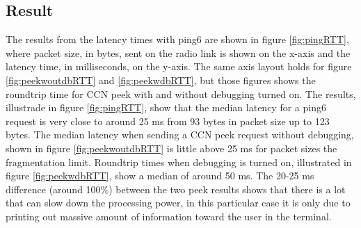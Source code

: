 \subsection{Result}

The results from the latency times with ping6 are shown in figure \ref{fig:pingRTT}, where packet size, in bytes, sent on the radio link is shown on the x-axis and the latency time, in milliseconds, on the y-axis. The same axis layout holds for figure \ref{fig:peekwoutdbRTT} and \ref{fig:peekwdbRTT}, but those figures shows the roundtrip time for CCN peek with and without debugging turned on. The results, illustrade in figure \ref{fig:pingRTT}, show that the median latency for a ping6 request is very close to around 25 ms from 93 bytes in packet size up to 123 bytes. The median latency when sending a CCN peek request without debugging, shown in figure \ref{fig:peekwoutdbRTT} is little above 25 ms for packet sizes the fragmentation limit. Roundtrip times when debugging is turned on, illustrated in figure \ref{fig:peekwdbRTT}, show a median of around 50 ms. The 20-25 ms difference (around 100$\%$) between the two peek results shows that there is a lot that can slow down the processing power, in this particular case it is only due to printing out massive amount of information toward the user in the terminal.\\\\
